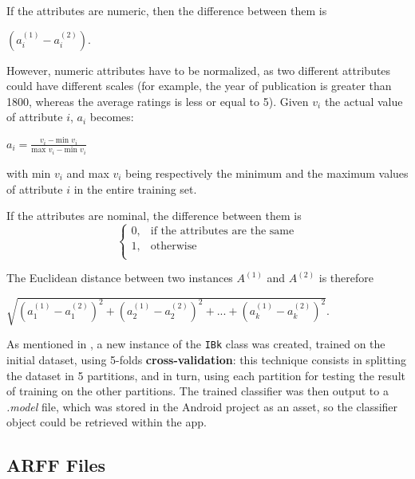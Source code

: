 \documentclass{mproj}
\begin{document}
If the attributes are numeric, then the difference between them is 
\begin{center}
	$(a_i^{(1)} - a_i^{(2)})$.
\end{center}

However, numeric attributes have to be normalized, as two different attributes could have different scales (for example, the year of publication is greater than 1800, whereas the average ratings is less or equal to 5). Given $v_i$ the actual value of attribute $i$, $a_i$ becomes:
\begin{center}
	$a_i = \frac{v_i - \text{min } v_i}{\text{max } v_i - \text{min } v_i}$
\end{center}
with min $v_i$ and max $v_i$ being respectively the minimum and the maximum values of attribute $i$ in the entire training set. 

If the attributes are nominal, the difference between them is
\begin{equation}
	\begin{cases}
		0, & \text{if the attributes are the same}\\
		1, & \text{otherwise}\\
	\end{cases}
\end{equation}

The Euclidean distance between two instances $A^{(1)}$ and $A^{(2)}$ is therefore
\begin{center}
	$\sqrt{(a_1^{(1)} - a_1^{(2)})^2 + (a_2^{(1)} - a_2^{(2)})^2 + ... + (a_k^{(1)} - a_k^{(2)})^2}$.
\end{center}

As mentioned in , a new instance of the \verb|IBk| class was created, trained on the initial dataset, using 5-folds \textbf{cross-validation}: this technique consists in splitting the dataset in 5 partitions, and in turn, using each partition for testing the result of training on the other partitions. \cite[Chapter~5]{wekabook} The trained classifier was then output to a \textit{.model} file, which was stored in the Android project as an asset, so the classifier object could be retrieved within the app.

\subsection*{ARFF Files}
\end{document}

